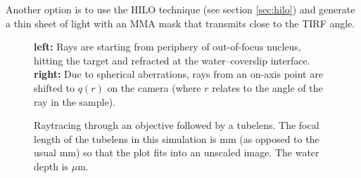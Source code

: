 Another option is to use the HILO technique (see section
\ref{sec:hilo}) and generate a thin sheet of light with an MMA mask
that transmits close to the TIRF angle.


\begin{figure}[!hbt]
  \centering
  \def\svgscale{.3}
   \quad 
  \caption{{\bf left:} Rays are starting from periphery of
    out-of-focus nucleus, hitting the target and refracted at the
    water--coverslip interface. {\bf right:} Due to spherical
    aberrations, rays from an on-axis point are shifted to $q(r)$ on
    the camera (where $r$ relates to the angle of the ray in the
    sample). }
\end{figure}
 
\begin{figure}[!hbt]
  \centering
  \caption{Raytracing through an objective followed by a tubelens. The
    focal length of the tubelens in this simulation is \unit[16]{mm}
    (as opposed to the usual \unit[160]{mm}) so that the plot fits
    into an unscaled image. The water depth is \unit[10]{$\mu$m}.}
  \label{fig:screen_microscope-aberrate-front}
\end{figure}

